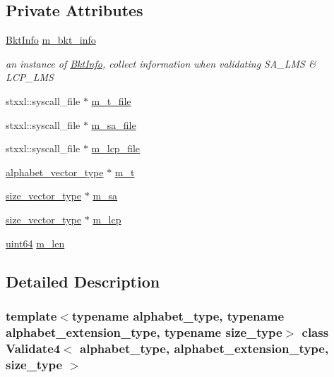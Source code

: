 \subsection*{Private Attributes}
\begin{DoxyCompactItemize}
\item 
\hyperlink{struct_validate4_1_1_bkt_info}{Bkt\+Info} \hyperlink{class_validate4_a4f79c420ccec4e83e536fae655fe7a11}{m\+\_\+bkt\+\_\+info}
\begin{DoxyCompactList}\small\item\em an instance of \hyperlink{struct_validate4_1_1_bkt_info}{Bkt\+Info}, collect information when validating S\+A\+\_\+\+L\+MS \& L\+C\+P\+\_\+\+L\+MS \end{DoxyCompactList}\item 
stxxl\+::syscall\+\_\+file $\ast$ \hyperlink{class_validate4_a63b517772b6359b72cf1c1a4ad5f14b5}{m\+\_\+t\+\_\+file}
\item 
stxxl\+::syscall\+\_\+file $\ast$ \hyperlink{class_validate4_a32bf87f5aa8dc5fda81440f23ce0cb45}{m\+\_\+sa\+\_\+file}
\item 
stxxl\+::syscall\+\_\+file $\ast$ \hyperlink{class_validate4_a04f44eed3b6ea4534076aff282adf037}{m\+\_\+lcp\+\_\+file}
\item 
\hyperlink{class_validate4_a49c80b3d101be19542a4341c2387603a}{alphabet\+\_\+vector\+\_\+type} $\ast$ \hyperlink{class_validate4_a421635668138c3d4cbe2b7c362d57006}{m\+\_\+t}
\item 
\hyperlink{class_validate4_a46ea31a0a4b23f583806792160421d15}{size\+\_\+vector\+\_\+type} $\ast$ \hyperlink{class_validate4_aa6e516f93f9b184ebf958a4c314588d5}{m\+\_\+sa}
\item 
\hyperlink{class_validate4_a46ea31a0a4b23f583806792160421d15}{size\+\_\+vector\+\_\+type} $\ast$ \hyperlink{class_validate4_a41b6536affab0d38c674648c9ee58959}{m\+\_\+lcp}
\item 
\hyperlink{types_8h_a60e8696a4678cd348e991a1f172e53f7}{uint64} \hyperlink{class_validate4_a4b57f273604a17a02e891b43bdd7f03e}{m\+\_\+len}
\end{DoxyCompactItemize}


\subsection{Detailed Description}
\subsubsection*{template$<$typename alphabet\+\_\+type, typename alphabet\+\_\+extension\+\_\+type, typename size\+\_\+type$>$\newline
class Validate4$<$ alphabet\+\_\+type, alphabet\+\_\+extension\+\_\+type, size\+\_\+type $>$}

